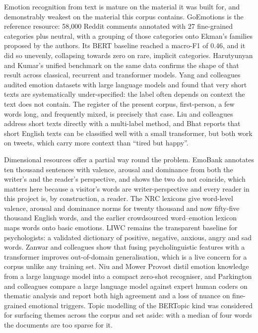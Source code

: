 Emotion recognition from text is mature on the material it was built for, and demonstrably weakest on the material this corpus contains. GoEmotions \cite{demszky2020goemotions} is the reference resource: 58,000 Reddit comments annotated with 27 fine-grained categories plus neutral, with a grouping of those categories onto Ekman's families proposed by the authors. Its BERT baseline reached a macro-F1 of 0.46, and it did so unevenly, collapsing towards zero on rare, implicit categories. Harutyunyan and Kumar's unified benchmark on the same data \cite{harutyunyan2026fine} confirms the shape of that result across classical, recurrent and transformer models. Yang and colleagues \cite{yang2023context} audited emotion datasets with large language models and found that very short texts are systematically under-specified: the label often depends on context the text does not contain. The register of the present corpus, first-person, a few words long, and frequently mixed, is precisely that case. Liu and colleagues \cite{liu2023emotion} address short texts directly with a multi-label method, and Bhat \cite{bhat2024emotion} reports that short English texts can be classified well with a small transformer, but both work on tweets, which carry more context than ``tired but happy''.

Dimensional resources offer a partial way round the problem. EmoBank \cite{buechel2017emobank} annotates ten thousand sentences with valence, arousal and dominance from both the writer's and the reader's perspective, and shows the two do not coincide, which matters here because a visitor's words are writer-perspective and every reader in this project is, by construction, a reader. The NRC lexicons give word-level valence, arousal and dominance norms for twenty thousand \cite{mohammad2018obtaining} and now fifty-five thousand \cite{mohammad2025nrc} English words, and the earlier crowdsourced word--emotion lexicon \cite{mohammad2013crowdsourcing} maps words onto basic emotions. LIWC \cite{tausczik2010psychological} remains the transparent baseline for psychologists: a validated dictionary of positive, negative, anxious, angry and sad words. Zanwar and colleagues \cite{zanwar2022improving} show that fusing psycholinguistic features with a transformer improves out-of-domain generalisation, which is a live concern for a corpus unlike any training set. Niu and Mower Provost \cite{niu2025contrastive} distil emotion knowledge from a large language model into a compact zero-shot recogniser, and Parkington and colleagues \cite{parkington2025human} compare a large language model against expert human coders on thematic analysis and report both high agreement and a loss of nuance on fine-grained emotional triggers. Topic modelling of the BERTopic kind \cite{grootendorst2022bertopic} was considered for surfacing themes across the corpus and set aside: with a median of four words the documents are too sparse for it.

